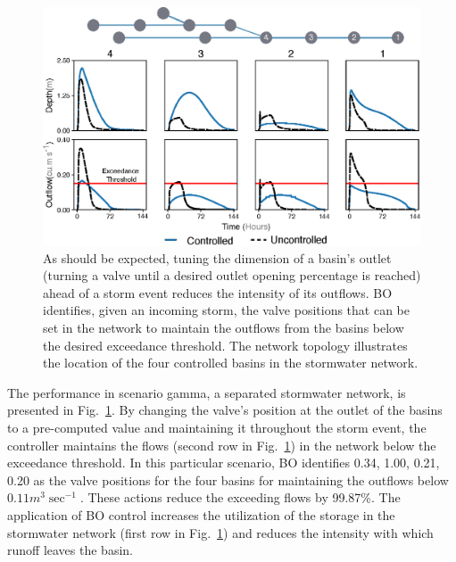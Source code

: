 \begin{figure}[ht]
	\includegraphics[width=\textwidth]{gfx/Chapter-4/performance.eps}
	\caption{As should be expected, tuning the dimension of a basin's outlet (turning a valve until a desired outlet opening percentage is reached) ahead of a storm event reduces the intensity of its outflows.
	BO identifies, given an incoming storm, the valve positions that can be set in the network to maintain the outflows from the basins below the desired exceedance threshold.
	The network topology illustrates the location of the four controlled basins in the stormwater network.}\label{fig:gamma-4}
\end{figure}

The performance in scenario gamma, a separated stormwater network, is presented in Fig.~\ref{fig:gamma-4}.
By changing the valve's position at the outlet of the basins to a pre-computed value and maintaining it throughout the storm event, the controller maintains the flows (second row in Fig.~\ref{fig:gamma-4}) in the network below the exceedance threshold.
In this particular scenario, BO identifies 0.34, 1.00, 0.21, 0.20 as the  valve positions for the four basins for maintaining the outflows below $0.11 m^3\sec^{-1}$. These actions reduce the exceeding flows by 99.87\%.
The application of BO control increases the utilization of the storage in the stormwater network (first row in Fig.~\ref{fig:gamma-4}) and reduces the intensity with which runoff leaves the basin.

